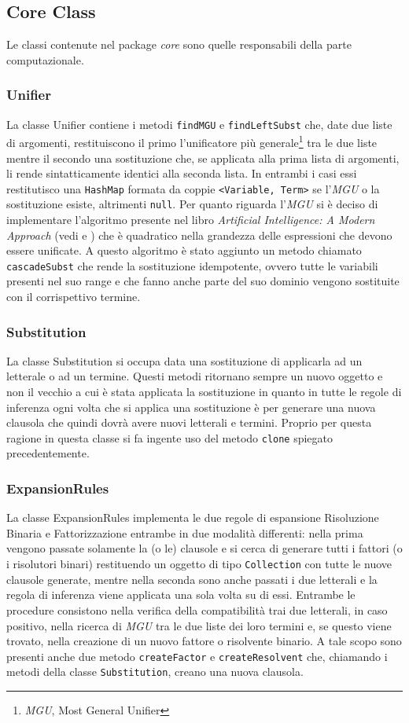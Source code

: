 \documentclass[a4paper,11pt]{article}
\begin{document}
\subsection{Core Class}
Le classi contenute nel package \emph{core} sono quelle responsabili della parte computazionale.
\subsubsection{Unifier}
La classe Unifier contiene i metodi \texttt{findMGU} e \texttt{findLeftSubst} che, date due liste di argomenti, restituiscono il primo l'unificatore più generale\footnote{\emph{MGU}, Most General Unifier} tra le due liste mentre il secondo una sostituzione che, se applicata alla prima lista di argomenti, li rende sintatticamente identici alla seconda lista. In entrambi i casi essi restitutisco una \texttt{HashMap} formata da coppie \texttt{<Variable, Term>} se l'\emph{MGU} o la sostituzione esiste, altrimenti \texttt{null}. Per quanto riguarda l'\emph{MGU} si è deciso di implementare l'algoritmo presente nel libro \emph{Artificial Intelligence: A Modern Approach} (vedi \cite{AIMAbook} e \cite{AIMAalgo}) che è quadratico nella grandezza delle espressioni che devono essere unificate. A questo algoritmo è stato aggiunto un metodo chiamato \texttt{cascadeSubst} che rende la sostituzione idempotente, ovvero tutte le variabili presenti nel suo range e che fanno anche parte del suo dominio vengono sostituite con il corrispettivo termine.
\subsubsection{Substitution}
La classe Substitution si occupa data una sostituzione di applicarla ad un letterale o ad un termine. Questi metodi ritornano sempre un nuovo oggetto e non il vecchio a cui è stata applicata la sostituzione in quanto in tutte le regole di inferenza ogni volta che si applica una sostituzione è per generare una nuova clausola che quindi dovrà avere nuovi letterali e termini. Proprio per questa ragione in questa classe si fa ingente uso del metodo \texttt{clone} spiegato precedentemente.
\subsubsection{ExpansionRules}
La classe ExpansionRules implementa le due regole di espansione Risoluzione Binaria e Fattorizzazione entrambe in due modalità differenti: nella prima vengono passate solamente la (o le) clausole e si cerca di generare tutti i fattori (o i risolutori binari) restituendo un oggetto di tipo \texttt{Collection} con tutte le nuove clausole generate, mentre nella seconda sono anche passati i due letterali e la regola di inferenza viene applicata una sola volta su di essi. Entrambe le procedure consistono nella verifica della compatibilità trai due letterali, in caso positivo, nella ricerca di \emph{MGU} tra le due liste dei loro termini e, se questo viene trovato, nella creazione di un nuovo fattore o risolvente binario. A tale scopo sono presenti anche due metodo \texttt{createFactor} e \texttt{createResolvent} che, chiamando i metodi della classe \texttt{Substitution}, creano una nuova clausola.
\end{document}
